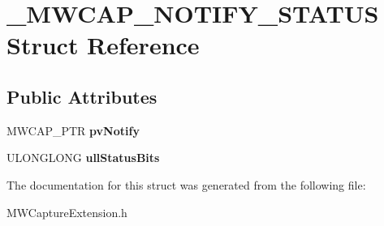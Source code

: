 \hypertarget{struct__MWCAP__NOTIFY__STATUS}{\section{\-\_\-\-M\-W\-C\-A\-P\-\_\-\-N\-O\-T\-I\-F\-Y\-\_\-\-S\-T\-A\-T\-U\-S Struct Reference}
\label{struct__MWCAP__NOTIFY__STATUS}
}
\subsection*{Public Attributes}
\begin{DoxyCompactItemize}
\item 
\hypertarget{struct__MWCAP__NOTIFY__STATUS_af970c6835bd24b0f85a3efe239a8ab2b}{M\-W\-C\-A\-P\-\_\-\-P\-T\-R {\bfseries pv\-Notify}}\label{struct__MWCAP__NOTIFY__STATUS_af970c6835bd24b0f85a3efe239a8ab2b}

\item 
\hypertarget{struct__MWCAP__NOTIFY__STATUS_ae5f7533020a990c93a55d20cd622e79d}{U\-L\-O\-N\-G\-L\-O\-N\-G {\bfseries ull\-Status\-Bits}}\label{struct__MWCAP__NOTIFY__STATUS_ae5f7533020a990c93a55d20cd622e79d}

\end{DoxyCompactItemize}


The documentation for this struct was generated from the following file\-:\begin{DoxyCompactItemize}
\item 
M\-W\-Capture\-Extension.\-h\end{DoxyCompactItemize}
